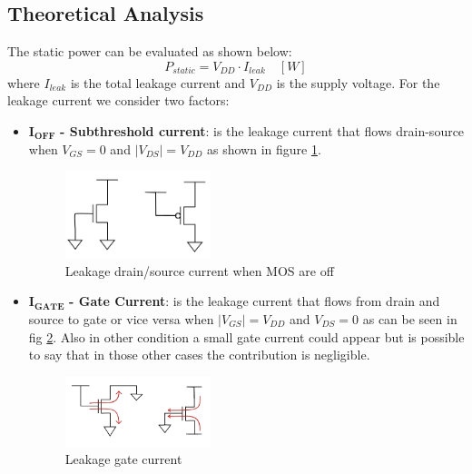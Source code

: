 \documentclass[12pt,  english, makeidx, a4paper, titlepage, oneside]{article}
\begin{document}
\subsection{Theoretical Analysis}
The static power can be evaluated as shown below:
\begin{equation}
P_{static}=V_{DD} \cdot I_{leak} \quad [W]
\end{equation}
where $I_{leak}$ is the total leakage current and $V_{DD}$ is the supply voltage.
For the leakage current we consider two factors:
\begin{itemize}
\item $\mathbf{I_{OFF}}$ \textbf{- Subthreshold current}: is the leakage current that flows drain-source when $V_{GS}=0$ and $|V_{DS}|=V_{DD}$ as shown in figure \ref{fig:ds_leakage}.
\begin{figure}[htbp]
\begin{center}
\includegraphics[width=0.4\textwidth]{img/mos_off.png}
\caption{Leakage drain/source current when MOS are off}
\label{fig:ds_leakage}
\end{center}
\end{figure}

\item $\mathbf{I_{GATE}}$ \textbf{- Gate Current}: is the leakage current that flows from drain and source to gate or vice versa when $|V_{GS}|=V_{DD}$ and $V_{DS}=0$  as can be seen in fig \ref{fig:gate_leakage}. Also in other condition a small gate current could appear but is possible to say that in those other cases the contribution is negligible.
\begin{figure}[htbp]
\begin{center}
\includegraphics[width=0.4\textwidth]{img/mos_gate.jpg}
\caption{Leakage gate current}
\label{fig:gate_leakage}
\end{center}
\end{figure}

\end{itemize}
\end{document}
